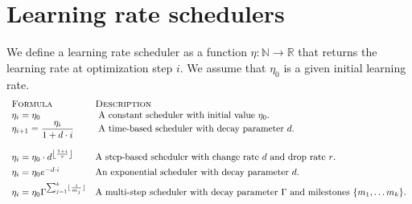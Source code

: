\documentclass[twoside,11pt]{article}
\newcommand{\set}[1]{\ensuremath{\{ #1 \} }} %
\newcommand{\Reals}{\mathbb{R}}
\begin{document}
\section{Learning rate schedulers} 
\label{appendix:learning-rate-schedulers}
We define a learning rate scheduler as a function $\eta: \mathbb{N} \rightarrow \Reals$ that returns the learning rate at optimization step $i$. We assume that $\eta_0$ is a given initial learning rate.
\[
\begin{array}{lll} %
\textsc{Formula} & \textsc{Description} 
\\
  \eta_{i}= \eta_0 
  & \text{ A constant scheduler with initial value $\eta_0$. }
\\
  \eta_{i+1} = \displaystyle \frac {\eta_{i}}{1+d \cdot i} 
  & \text{ A time-based scheduler with decay parameter $d$. } 
\\
\\
  \eta_{i} = \displaystyle \eta_{0} \cdot d^{ \left \lfloor {\frac {1+i}{r}} \right \rfloor } 
  & \text{A step-based scheduler with change rate $d$ and drop rate $r$. } 
\\
\addlinespace[1ex]
  \eta_{i} = \eta_{0} e^{-d \cdot i} 
  & \text{An exponential scheduler with decay parameter $d$.}
\\   
\addlinespace[1ex]
  \eta_{i} = \displaystyle \eta_{0} \Gamma^{\sum_{j=1}^k \lfloor \frac{i}{m_j} \rfloor}
  & \text{A multi-step scheduler with decay parameter $\Gamma$ and milestones $\set{m_1, \ldots m_k}$.}
\end{array}
\]
\end{document}
